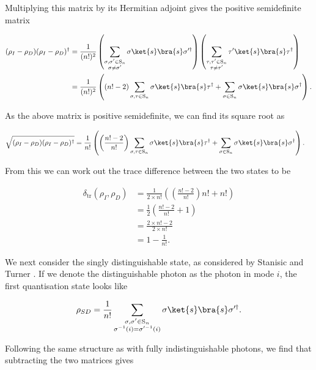 Multiplying this matrix by its Hermitian adjoint gives the positive semidefinite matrix

\begin{align}
(\rho_I - \rho_D)(\rho_I - \rho_D)^\dagger &= \frac{1}{(n!)^2}\left(\sum_{\substack{\sigma,\sigma'\in\textrm{S}_n\\\sigma\neq\sigma'}}\sigma\ket{s}\bra{s}\sigma'^\dagger\right)\left(\sum_{\substack{\tau,\tau'\in\textrm{S}_n\\\tau\neq\tau'}}\tau'\ket{s}\bra{s}\tau^\dagger\right)\\
&= \frac{1}{(n!)^2}\left((n! - 2)\sum_{\sigma,\tau\in\textrm{S}_n}\sigma\ket{s}\bra{s}\tau^\dagger + \sum_{\sigma \in \textrm{S}_n}\sigma\ket{s}\bra{s}\sigma^\dagger\right).
\end{align}

As the above matrix is positive semidefinite, we can find its square root as

\begin{align}
\sqrt{(\rho_I - \rho_D)(\rho_I - \rho_D)^\dagger} &= \frac{1}{n!}\left(\left(\frac{n!-2}{n!}\right)\sum_{\sigma,\tau\in\textrm{S}_n}\sigma\ket{s}\bra{s}\tau^\dagger + \sum_{\sigma \in \textrm{S}_n}\sigma\ket{s}\bra{s}\sigma^\dagger\right).
\end{align}

From this we can work out the trace difference between the two states to be

\begin{align}
\delta_{\mathrm{tr}}(\rho_I, \rho_D) &= \frac{1}{2\times n!}\left(\left(\frac{n!-2}{n!}\right)n! + n!\right)\\
&= \frac{1}{2}\left(\frac{n!-2}{n!} + 1\right)\\
&= \frac{2 \times n! - 2}{2 \times n!}\\
&= 1 - \frac{1}{n!}.
\end{align}

We next consider the singly distinguishable state, as considered by Stanisic and Turner \cite{stanisic2018}. If we denote the distinguishable photon as the photon in mode $i$, the first quantisation state looks like

$$\rho_{SD} = \frac{1}{n!}\sum_{\substack{\sigma,\sigma'\in\textrm{S}_n\\\sigma^{-1}(i)=\sigma'^{-1}(i)}}\sigma\ket{s}\bra{s}\sigma'^\dagger.$$

Following the same structure as with fully indistinguishable photons, we find that subtracting the two matrices gives

